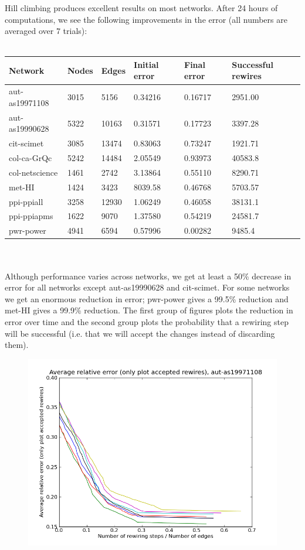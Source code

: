 \documentclass[12pt]{article}
\begin{document}
Hill climbing produces excellent results on most networks.  After 24 hours of computations, we see the following improvements in the error (all numbers are averaged over $7$ trials):
\\\\
\begin{tabular}{| l | l | l | | l | l | l |}
\hline
Network & Nodes & Edges & Initial error & Final error & Successful rewires\\ \hline
aut-as19971108 & 3015 & 5156 & 0.34216 & 0.16717 & 2951.00\\\hline
aut-as19990628 & 5322 & 10163 & 0.31571 & 0.17723 & 3397.28\\\hline
cit-scimet & 3085 & 13474 & 0.83063 & 0.73247 & 1921.71\\\hline
col-ca-GrQc & 5242 & 14484 & 2.05549 & 0.93973 & 40583.8\\\hline
col-netscience & 1461 & 2742 & 3.13864 & 0.55110 & 8290.71\\\hline
met-HI & 1424 & 3423 & 8039.58 & 0.46768 & 5703.57\\\hline
ppi-ppiall & 3258 & 12930 & 1.06249 & 0.46058 & 38131.1\\\hline
ppi-ppiapms & 1622 & 9070 & 1.37580 & 0.54219 & 24581.7\\\hline
pwr-power & 4941 & 6594 & 0.57996 & 0.00282 & 9485.4\\\hline
\end{tabular}
\\\\
Although performance varies across networks, we get at least a 50\% decrease in error for all networks except aut-as19990628 and cit-scimet.  For some networks we get an enormous reduction in error; pwr-power gives a 99.5\% reduction and met-HI gives a 99.9\% reduction.  The first group of figures plots the reduction in error over time and the second group plots the probability that a rewiring step will be successful (i.e. that we will accept the changes instead of discarding them).

\begin{figure}[p]
\includegraphics[scale=0.75]{acceptedOnly-aut-as19971108.png}\\
\end{figure}
\end{document}

